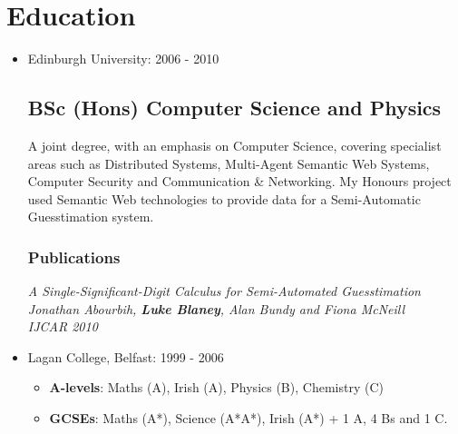 \documentclass[a4paper]{article}
\newenvironment{detail}{\begin{adjustwidth}{10pt}{}}{\end{adjustwidth}}
\begin{document}
\section*{Education}
\begin{itemize}

\item Edinburgh University: 2006 - 2010
\subsection*{BSc (Hons) Computer Science and Physics}
\begin{detail}
A joint degree, with an emphasis on Computer Science, covering specialist areas such as Distributed Systems, Multi-Agent Semantic Web Systems, Computer Security and Communication \& Networking.
My Honours project used Semantic Web technologies to provide data for a Semi-Automatic Guesstimation system.
\subsubsection*{Publications}
\em A Single-Significant-Digit Calculus for Semi-Automated Guesstimation \em\\
Jonathan Abourbih, {\bf Luke Blaney}, Alan Bundy and Fiona McNeill\\
IJCAR 2010
\end{detail}

\item Lagan College, Belfast: 1999 - 2006
\begin{itemize}\item {\bf A-levels}: Maths (A), Irish (A), Physics (B), Chemistry (C)
\item {\bf GCSEs}: Maths (A*), Science (A*A*), Irish (A*) + 1 A, 4 Bs and 1 C.
\end{itemize}

\end{itemize}
\end{document}
